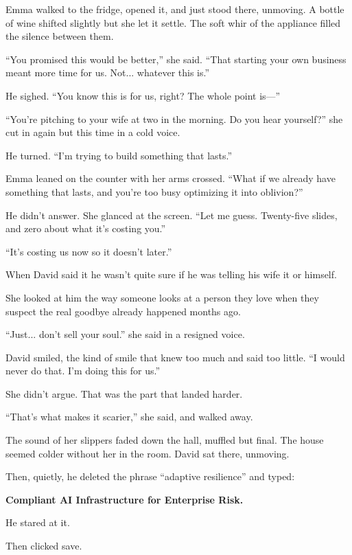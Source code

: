 Emma walked to the fridge, opened it, and just stood there, unmoving. A bottle of wine shifted slightly but she let it 
settle. The soft whir of the appliance filled the silence between them.

``You promised this would be better,'' she said. ``That starting your own business meant more time for us. Not... 
whatever this is.''

He sighed. ``You know this is for us, right? The whole point is—''

``You’re pitching to your wife at two in the morning. Do you hear yourself?'' she cut in again but this time in a cold voice.

He turned. ``I’m trying to build something that lasts.''

Emma leaned on the counter with her arms crossed. ``What if we already have something that lasts, and you’re too busy optimizing 
it into oblivion?''

He didn’t answer. She glanced at the screen.  ``Let me guess. Twenty-five slides, and zero about what it’s costing you.''

``It’s costing us now so it doesn’t later.'' 

When David said it he wasn't quite sure if he was telling his wife it or himself. 

She looked at him the way someone looks at a person they love when they suspect the real goodbye already 
happened months ago.

``Just... don’t sell your soul.'' she said in a resigned voice.

David smiled, the kind of smile that knew too much and said too little. ``I would never do that. I’m doing this for us.''

She didn’t argue. That was the part that landed harder.

``That’s what makes it scarier,'' she said, and walked away.

The sound of her slippers faded down the hall, muffled but final. The house seemed colder without her in the room. 
David sat there, unmoving.

Then, quietly, he deleted the phrase ``adaptive resilience'' and typed:

\textbf{Compliant AI Infrastructure for Enterprise Risk.}

He stared at it.

Then clicked save.


\medskip

